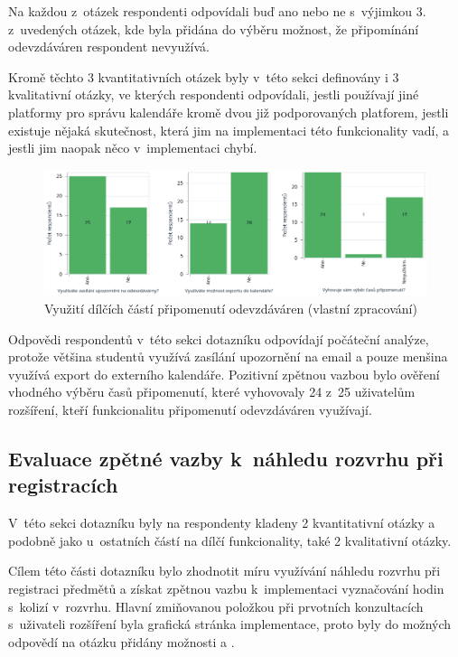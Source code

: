Na každou z~otázek respondenti odpovídali buď ano nebo ne s~výjimkou 3. z~uvedených otázek, kde byla přidána do výběru možnost, že připomínání odevzdáváren respondent nevyužívá.

Kromě těchto 3 kvantitativních otázek byly v~této sekci definovány i 3 kvalitativní otázky, ve kterých respondenti odpovídali, jestli používají jiné platformy pro správu kalendáře kromě dvou již podporovaných platforem, jestli existuje nějaká skutečnost, která jim na implementaci této funkcionality vadí, a jestli jim naopak něco v~implementaci chybí.

\begin{figure}[htbp!]\centering
    \includegraphics[width=\textwidth]{img/pripomenuti-vizualizace.png}
    \caption{Využití dílčích částí připomenutí odevzdáváren (vlastní zpracování)}
    \label{fig:pripomenuti-vizualizace}
\end{figure}

Odpovědi respondentů v~této sekci dotazníku odpovídají počáteční analýze, protože většina studentů využívá zasílání upozornění na email a pouze menšina využívá export do externího kalendáře. Pozitivní zpětnou vazbou bylo ověření vhodného výběru časů připomenutí, které vyhovovaly 24 z~25 uživatelům rozšíření, kteří funkcionalitu připomenutí odevzdáváren využívají.

\subsection{Evaluace zpětné vazby k~náhledu rozvrhu při registracích}

V~této sekci dotazníku byly na respondenty kladeny 2 kvantitativní otázky a podobně jako u~ostatních částí na dílčí funkcionality, také 2 kvalitativní otázky.

Cílem této části dotazníku bylo zhodnotit míru využívání náhledu rozvrhu při registraci předmětů a získat zpětnou vazbu k~implementaci vyznačování hodin s~kolizí v~rozvrhu. Hlavní zmiňovanou položkou při prvotních konzultacích s~uživateli rozšíření byla grafická stránka implementace, proto byly do možných odpovědí na otázku  přidány možnosti  a .  

